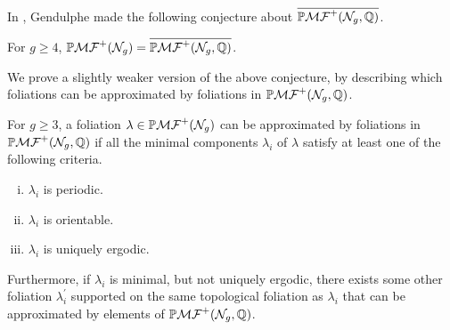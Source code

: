 \documentclass[12pt, reqno]{amsart}
\begin{document}
In \cite{gendulphe_whats_2017}, Gendulphe made the following conjecture about $\overline{\mathbb{P}\mathcal{MF}^+(\mathcal{N}_g, \mathbb{Q})}$.
\begin{conjecture}
  For $g \geq 4$, $\mathbb{P}\mathcal{MF}^+(\mathcal{N}_g) = \overline{\mathbb{P}\mathcal{MF}^+(\mathcal{N}_g, \mathbb{Q})}$.
\end{conjecture}
We prove a slightly weaker version of the above conjecture, by describing which foliations can be approximated by foliations in $\mathbb{P}\mathcal{MF}^+(\mathcal{N}_g, \mathbb{Q})$.
\begin{theorem}
  \label{thm:rational-approximation}
  For $g \geq 3$, a foliation $\lambda \in \mathbb{P}\mathcal{MF}^+(\mathcal{N}_g)$ can be approximated by foliations in $\mathbb{P}\mathcal{MF}^+(\mathcal{N}_g, \mathbb{Q})$ if all the minimal components $\lambda_i$ of $\lambda$ satisfy at least one of the following criteria.
  \begin{enumerate}[(i)]
  \item $\lambda_i$ is periodic.
  \item $\lambda_i$ is orientable.
  \item $\lambda_i$ is uniquely ergodic.
  \end{enumerate}
  Furthermore, if $\lambda_i$ is minimal, but not uniquely ergodic, there exists some other foliation $\lambda_i^{\prime}$ supported on the same topological foliation as $\lambda_i$ that can be approximated by elements of $\mathbb{P}\mathcal{MF}^+(\mathcal{N}_g, \mathbb{Q})$.
\end{theorem}
\end{document}
